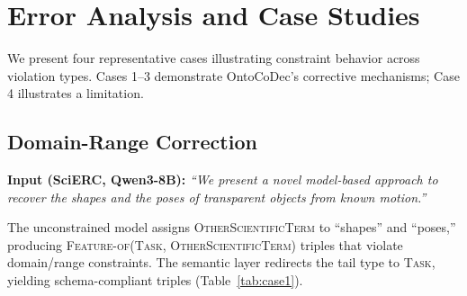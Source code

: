 
\section{Error Analysis and Case Studies}
\label{app:case-studies}

\newcommand{\viol}[1]{\textcolor{violation}{\st{#1}}}
\newcommand{\fixd}[1]{\textcolor{fixed}{\textbf{#1}}}

We present four representative cases illustrating constraint behavior across violation types. Cases 1--3 demonstrate OntoCoDec's corrective mechanisms; Case 4 illustrates a limitation.

\subsection{Domain-Range Correction}
\label{app:case-dr}

\noindent\textbf{Input (SciERC, Qwen3-8B):} \textit{``We present a novel model-based approach to recover the shapes and the poses of transparent objects from known motion.''}

The unconstrained model assigns \textsc{OtherScientificTerm} to ``shapes'' and ``poses,'' producing \textsc{Feature-of}(\textsc{Task}, \textsc{OtherScientificTerm}) triples that violate domain/range constraints. The semantic layer redirects the tail type to \textsc{Task}, yielding schema-compliant triples (Table~\ref{tab:case1}).

